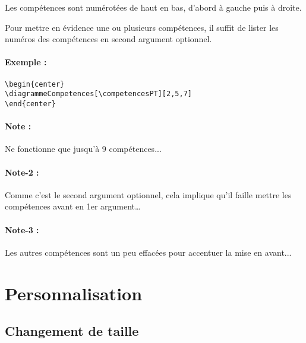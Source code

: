 \documentclass[a4paper,12pt]{article}
\begin{document}
		Les compétences sont numérotées de haut en bas, d'abord à gauche puis à droite.

		\begin{center}
			\diagrammeCompetences[1,2,3,4,5,6,7,...]
		\end{center}

		Pour mettre en évidence une ou plusieurs compétences, il suffit de lister les numéros des compétences en second argument optionnel.
		
		\paragraph{Exemple :}
\begin{verbatim}
\begin{center}
\diagrammeCompetences[\competencesPT][2,5,7]
\end{center}
\end{verbatim}

		\begin{center}
			\diagrammeCompetences[\competencesPT][2,5,7]
		\end{center}
		
		\paragraph{Note :} Ne fonctionne que jusqu'à 9 compétences...
		\paragraph{Note-2 :} Comme c'est le second argument optionnel, cela implique qu'il faille mettre les compétences avant en 1er argument\dots
		\paragraph{Note-3 :} Les autres compétences sont un peu effacées pour accentuer la mise en avant...
		
		
	
	\section{Personnalisation}


		\subsection{Changement de taille}
\end{document}
